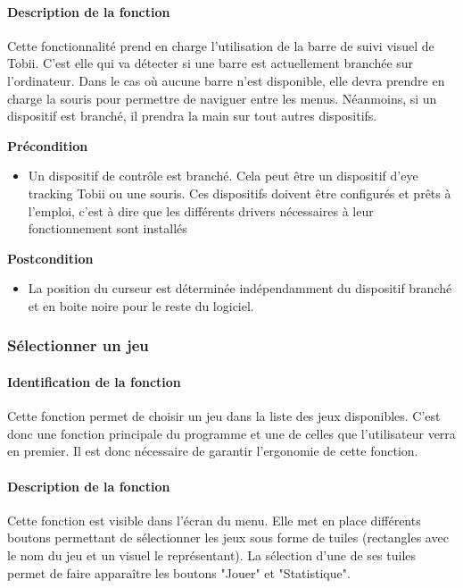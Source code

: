 \documentclass{polytech/polytech}
\begin{document}
\paragraph{Description de la fonction}
Cette fonctionnalité prend en charge l'utilisation de la barre de suivi visuel de Tobii. C'est elle qui va détecter si une barre est actuellement branchée sur l'ordinateur. Dans le cas où aucune barre n'est disponible, elle devra prendre en charge la souris pour permettre de naviguer entre les menus. Néanmoins, si un dispositif est branché, il prendra la main sur tout autres dispositifs.

\textbf{Précondition}
\begin{itemize}
\item Un dispositif de contrôle est branché. Cela peut être un dispositif d'eye tracking Tobii ou une souris. Ces dispositifs doivent être configurés et prêts à l'emploi, c'est à dire que les différents drivers nécessaires à leur fonctionnement sont installés
\end{itemize}

\textbf{Postcondition}
\begin{itemize}
\item La position du curseur est déterminée indépendamment du dispositif branché et  en boite noire pour le reste du logiciel.
\end{itemize}

\subsubsection{Sélectionner un jeu}
\paragraph{Identification de la fonction}
Cette fonction permet de choisir un jeu dans la liste des jeux disponibles. C'est donc une fonction principale du programme et une de celles que l'utilisateur verra en premier. Il est donc nécessaire de garantir l'ergonomie de cette fonction.

\paragraph{Description de la fonction}
Cette fonction est visible dans l'écran du menu. Elle met en place différents boutons permettant de sélectionner les jeux sous forme de tuiles (rectangles avec le nom du jeu et un visuel le représentant). La sélection d'une de ses tuiles permet de faire apparaître  les boutons "Jouer" et "Statistique". 
\end{document}
